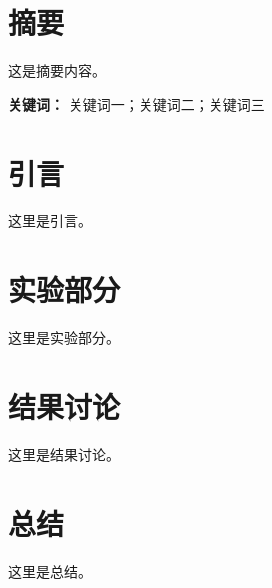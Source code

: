 \documentclass[12pt]{ctexart}
\begin{document}


\newpage \section*{摘要}

这是摘要内容。

\textbf{关键词：} 关键词一；关键词二；关键词三



\newpage \tableofcontents

\newpage
\section{引言}
这里是引言。

\section{实验部分}
这里是实验部分。

\section{结果讨论}
这里是结果讨论。

\section{总结}
这里是总结。


\end{document}
